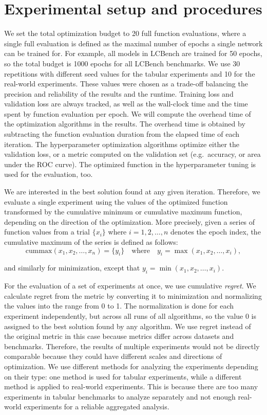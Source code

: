 \section{Experimental setup and procedures}
We set the total optimization budget to 20 full function evaluations, where a single full evaluation is defined as the maximal number of epochs a single network can be trained for. For example, all models in LCBench are trained for 50 epochs, so the total budget is 1000 epochs for all LCBench benchmarks. We use 30 repetitions with different seed values for the tabular experiments and 10 for the real-world experiments. These values were chosen as a trade-off balancing the precision and reliability of the results and the runtime. Training loss and validation loss are always tracked, as well as the wall-clock time and the time spent by function evaluation per epoch. We will compute the overhead time of the optimization algorithms in the results. The overhead time is obtained by subtracting the function evaluation duration from the elapsed time of each iteration. The hyperparameter optimization algorithms optimize either the validation loss, or a metric computed on the validation set (e.g.\ accuracy, or area under the ROC curve). The optimized function in the hyperparameter tuning is used for the evaluation, too.

We are interested in the best solution found at any given iteration. Therefore, we evaluate a single experiment using the values of the optimized function transformed by the cumulative minimum or cumulative maximum function, depending on the direction of the optimization. More precisely, given a series of function values from a trial \( \{x_i\} \) where \( i = 1, 2, \ldots, n \) denotes the epoch index, the cumulative maximum of the series is defined as follows:
\[
\text{cummax}(x_1, x_2, \ldots, x_n) = \{y_i\} \quad \text{where} \quad y_i = \max(x_1, x_2, \ldots, x_i),
\]

\noindent
and similarly for minimization, except that $y_i = \min(x_1, x_2, \ldots, x_i)$.

For the evaluation of a set of experiments at once, we use cumulative \textit{regret}. We calculate regret from the metric by converting it to minimization and normalizing the values into the range from 0 to 1. The normalization is done for each experiment independently, but across all runs of all algorithms, so the value 0 is assigned to the best solution found by any algorithm. We use regret instead of the original metric in this case because metrics differ across datasets and benchmarks. Therefore, the results of multiple experiments would not be directly comparable because they could have different scales and directions of optimization. We use different methods for analyzing the experiments depending on their type: one method is used for tabular experiments, while a different method is applied to real-world experiments. This is because there are too many experiments in tabular benchmarks to analyze separately and not enough real-world experiments for a reliable aggregated analysis.

